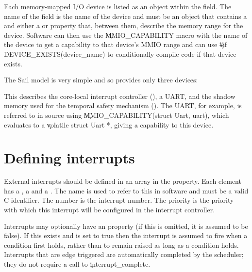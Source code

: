 Each memory-mapped I/O device is listed as an object within the  field.
The name of the field is the name of the device and must be an object that contains a  and either a  or  property that, between them, describe the memory range for the device.
Software can then use the \c{MMIO_CAPABILITY} macro with the name of the device to get a capability to that device's MMIO range and can use \c{#if DEVICE_EXISTS(device_name)} to conditionally compile code if that device exists.

The Sail model is very simple and so provides only three devices:

\begin{jsonsnippet}
    "devices": {
        "clint": {
            "start": 0x2000000,
            "length": 0x10000
        \},
        "uart": {
            "start": 0x10000000,
            "end":   0x10000100
        \},
        "shadow" : {
            "start" : 0x83000000,
            "end"   : 0x83001000
        \}
    \},
\end{jsonsnippet}

This describes the core-local interrupt controller (), a UART, and the shadow memory used for the temporal safety mechanism ().
The UART, for example, is referred to in source using \c{MMIO_CAPABILITY(struct Uart, uart)}, which evaluates to a \c{volatile struct Uart *}, giving a capability to this device.

\section{Defining interrupts}

External interrupts should be defined in an array in the  property.
Each element has a , a  and a .
The name is used to refer to this in software and must be a valid C identifier.
The number is the interrupt number.
The priority is the priority with which this interrupt will be configured in the interrupt controller.

Interrupts may optionally have an  property (if this is omitted, it is assumed to be false).
If this exists and is set to true then the interrupt is assumed to fire when a condition first holds, rather than to remain raised as long as a condition holds.
Interrupts that are edge triggered are automatically completed by the scheduler; they do not require a call to \c{interrupt_complete}.

